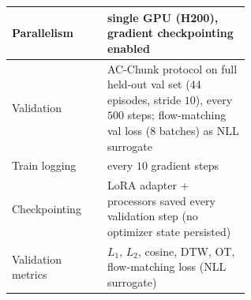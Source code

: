 \documentclass[english,12pt,a4paper,pdftex,elec,utf8]{aaltothesis}
\begin{document}
\begin{table}[t]
\begin{tabular}{@{}l p{0.60\linewidth}@{}}
    Parallelism                 & single GPU (H200), gradient checkpointing enabled \\
    \midrule
    Validation                  & AC-Chunk protocol on full held-out val set ($44$ episodes, stride $10$), every $500$ steps; flow-matching val loss ($8$ batches) as NLL surrogate \\
    Train logging                & every $10$ gradient steps \\
    Checkpointing                & LoRA adapter + processors saved every validation step (no optimizer state persisted) \\
    Validation metrics          & $L_1$, $L_2$, cosine, DTW, OT, flow-matching loss (NLL surrogate) \\
    \bottomrule
  \end{tabular}
\end{table}
\end{document}
